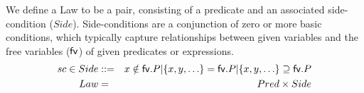 We define a Law to be a pair,
consisting of a predicate and an associated side-condition ($Side$).
Side-conditions are a conjunction of zero or more basic conditions,
which typically capture relationships between given variables and
the free variables ($\mathsf{fv}$) of given predicates or expressions.
\begin{eqnarray*}
   sc \in Side &::=&  x \notin \mathsf{fv}.P
         | \{x,y,\ldots\} = \mathsf{fv}.P
         | \{x,y,\ldots\} \supseteq \mathsf{fv}.P
\\ Law &=& Pred \times Side
\end{eqnarray*}
